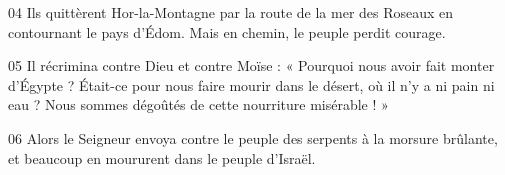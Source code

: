 
04 Ils quittèrent Hor-la-Montagne par la route de la mer des Roseaux en contournant le pays d’Édom. Mais en chemin, le peuple perdit courage.

05 Il récrimina contre Dieu et contre Moïse : « Pourquoi nous avoir fait monter d’Égypte ? Était-ce pour nous faire mourir dans le désert, où il n’y a ni pain ni eau ? Nous sommes dégoûtés de cette nourriture misérable ! »

06 Alors le Seigneur envoya contre le peuple des serpents à la morsure brûlante, et beaucoup en moururent dans le peuple d’Israël.
